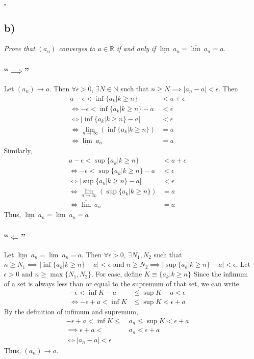 \documentclass[12pt]{article}
\begin{document}
\hfill $\square$

\subsection*{ b)}
{\it Prove that $(a_n)$ converges to $a \in \mathbb{R}$ if and only if $\underline{\lim}\ a_n = \overline{\lim}\ a_n = a$.}

\subsubsection*{``$\implies$''}

Let $(a_n) \rightarrow a$.  Then $\forall\epsilon > 0$, $\exists N \in\mathbb{N}$ such that $n \geq N \implies |a_n - a| < \epsilon$.  Then
\begin{align*}
	a - \epsilon < \inf\{a_k | k \geq n\} &< a + \epsilon \\
	\iff -\epsilon < \inf\{a_k | k \geq n\} - a &< \epsilon \\
	\iff |\inf\{a_k | k \geq n\} - a| &< \epsilon \\
	\iff \lim_{n\rightarrow\infty}\left(\inf\{a_k | k \geq n\}\right) &= a \\
	\iff \underline{\lim}\ a_n &= a
\end{align*}
Similarly,
\begin{align*}
	a - \epsilon < \sup\{a_k | k \geq n\} &< a + \epsilon \\
	\iff -\epsilon < \sup\{a_k | k \geq n\} - a &< \epsilon \\
	\iff |\sup\{a_k | k \geq n\} - a| &< \epsilon \\
	\iff \lim_{n\rightarrow\infty}\left(\sup\{a_k | k \geq n\}\right) &= a \\
	\iff \overline{\lim}\ a_n &= a
\end{align*}
Thus, $\underline{\lim}\ a_n = \overline{\lim}\ a_n = a$

\subsubsection*{``$\Longleftarrow$''}

Let $\underline{\lim}\ a_n = \overline{\lim}\ a_n = a$.  Then $\forall\epsilon > 0$, $\exists N_1, N_2$ such that $n \geq N_1 \implies |\inf\{a_k | k \geq n\} - a| < \epsilon$ and $n \geq N_2 \implies |\sup\{a_k | k \geq n\} - a| < \epsilon$.  Let $\epsilon > 0$ and $n \geq \max\{N_1, N_2\}$.  For ease, define $K \equiv \{a_k | k \geq n\}$  Since the infimum of a set is always less than or equal to the supremum of that set, we can write
\begin{align*}
	-\epsilon < \inf K - a &\leq \sup K - a < \epsilon \\
	\iff -\epsilon + a < \inf K &\leq \sup K < \epsilon + a
\end{align*}
By the definition of infimum and supremum,
\begin{align*}
	-\epsilon + a < \inf K \leq\ &a_n \leq \sup K < \epsilon + a \\
	\implies \epsilon + a <\ &a_n < \epsilon + a \\
	\iff |a_n - a| < \epsilon
\end{align*}
Thus, $(a_n) \rightarrow a$. \\
\end{document}
